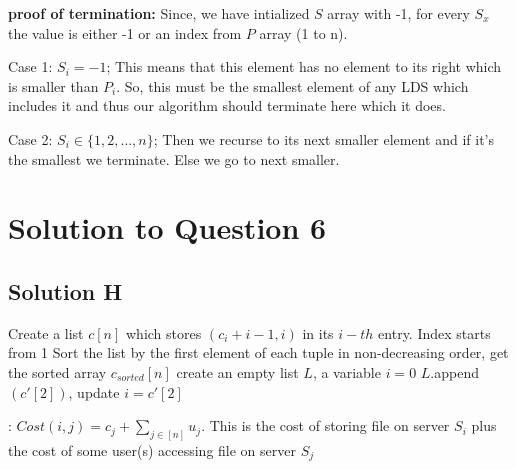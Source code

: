 \documentclass[11pt]{article}
\begin{document}
{\bf proof of termination:}
Since, we have intialized $S$ array with -1, for every $S_x$ the value is either -1 or an index from $P$ array (1 to n).

Case 1: $S_i = -1$; This means that this element has no element to its right which is smaller than $P_i$. 
So, this must be the smallest element of any LDS which includes it and  thus our algorithm should terminate here which it does.

Case 2: $S_i \in \{1,2, \dots, n\}$; Then we recurse to  its next smaller element and if it's the smallest we terminate. Else we go to next smaller.

\section{Solution to Question 6}

\subsection{Solution H}


\begin{algorithm}
\begin{algorithmic}
  \State Create a list $c[n]$ which stores $(c_i+i-1, i)$ in its $i-th$ entry. Index starts from 1
  \State Sort the list by the first element of each tuple in non-decreasing order, get the sorted array $c_{sorted}[n]$
  \State create an empty list $L$, a variable $i = 0$
      \State $L$.append$(c'[2])$, update $i = c'[2]$ 
    \EndIf
  \EndFor
\end{algorithmic}
\end{algorithm}

: {\it $Cost(i, j) = c_j + \sum_{j \in [n]} u_j$}. This is the cost of storing file on server $S_i$ plus the cost of some user(s) accessing file on server $S_j$
\end{document}
